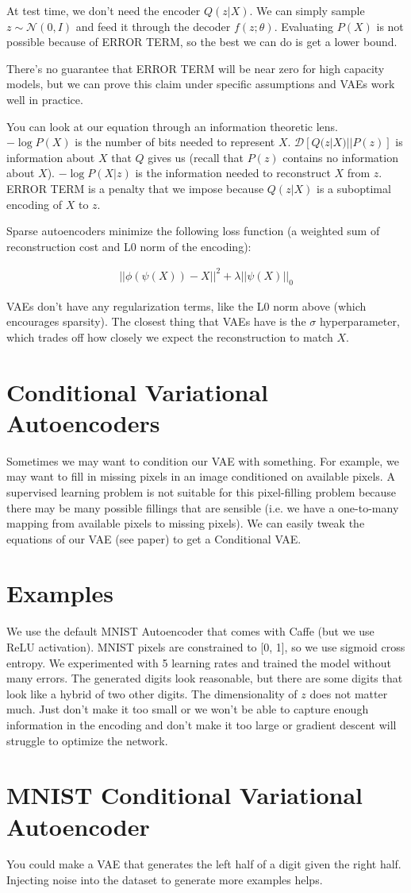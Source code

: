 \documentclass[a4paper]{article}
\begin{document}
At test time, we don't need the encoder $Q(z|X)$. We can simply sample
$z \sim \mathcal{N}(0, I)$ and feed it through the decoder $f(z; \theta)$.
Evaluating $P(X)$ is not possible because of ERROR TERM, so the best we can do
is get a lower bound.

There's no guarantee that ERROR TERM will be near zero for high capacity
models, but we can prove this claim under specific assumptions and VAEs work
well in practice.

You can look at our equation through an information theoretic lens.
$-\log{P(X)}$ is the number of bits needed to represent $X$.
$\mathcal{D}[Q(z|X) || P(z)]$ is information about $X$ that $Q$ gives us
(recall that $P(z)$ contains no information about $X$). $-\log{P(X|z)}$ is
the information needed to reconstruct $X$ from $z$. ERROR TERM is a penalty
that we impose because $Q(z|X)$ is a suboptimal encoding of $X$ to $z$.

Sparse autoencoders minimize the following loss function (a weighted sum
of reconstruction cost and L0 norm of the encoding):

\begin{align}
  ||\phi(\psi(X)) - X||^2 + \lambda ||\psi(X)||_0
\end{align}

VAEs don't have any regularization terms, like the L0 norm above (which
encourages sparsity). The closest thing that VAEs have is the $\sigma$
hyperparameter, which trades off how closely we expect the reconstruction to
match $X$.

\section{Conditional Variational Autoencoders}
Sometimes we may want to condition our VAE with something. For example,
we may want to fill in missing pixels in an image conditioned on available
pixels. A supervised learning problem is not suitable for this pixel-filling
problem because there may be many possible fillings that are sensible (i.e.
we have a one-to-many mapping from available pixels to missing pixels).
We can easily tweak the equations of our VAE (see paper) to get a Conditional
VAE.

\section{Examples}
We use the default MNIST Autoencoder that comes with Caffe (but we use ReLU
activation). MNIST pixels are constrained to [0, 1], so we use sigmoid
cross entropy. We experimented with 5 learning rates and trained the model
without many errors. The generated digits look reasonable, but there are
some digits that look like a hybrid of two other digits. The dimensionality of
$z$ does not matter much. Just don't make it too small or we won't be able
to capture enough information in the encoding and don't make it too large or
gradient descent will struggle to optimize the network.

\section{MNIST Conditional Variational Autoencoder}
You could make a VAE that generates the left half of a digit given the right
half. Injecting noise into the dataset to generate more examples helps.
\end{document}
